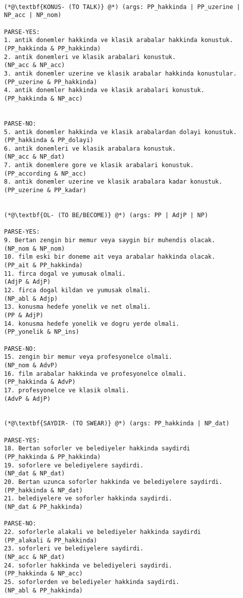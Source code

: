 \begin{lstlisting}

(*@\textbf{KONUS- (TO TALK)} @*) (args: PP_hakkinda | PP_uzerine | NP_acc | NP_nom)

PARSE-YES:
1. antik donemler hakkinda ve klasik arabalar hakkinda konustuk. 
(PP_hakkinda & PP_hakkinda) 
2. antik donemleri ve klasik arabalari konustuk. 
(NP_acc & NP_acc)
3. antik donemler uzerine ve klasik arabalar hakkinda konustular. 
(PP_uzerine & PP_hakkinda)
4. antik donemler hakkinda ve klasik arabalari konustuk.
(PP_hakkinda & NP_acc)


PARSE-NO:
5. antik donemler hakkinda ve klasik arabalardan dolayi konustuk.
(PP_hakkinda & PP_dolayi)
6. antik donemleri ve klasik arabalara konustuk.
(NP_acc & NP_dat)
7. antik donemlere gore ve klasik arabalari konustuk.
(PP_according & NP_acc)
8. antik donemler uzerine ve klasik arabalara kadar konustuk.
(PP_uzerine & PP_kadar)


(*@\textbf{OL- (TO BE/BECOME)} @*) (args: PP | AdjP | NP)

PARSE-YES:
9. Bertan zengin bir memur veya saygin bir muhendis olacak.
(NP_nom & NP_nom)
10. film eski bir doneme ait veya arabalar hakkinda olacak.
(PP_ait & PP_hakkinda)
11. firca dogal ve yumusak olmali.
(AdjP & AdjP)
12. firca dogal kildan ve yumusak olmali.
(NP_abl & Adjp)
13. konusma hedefe yonelik ve net olmali.
(PP & AdjP)
14. konusma hedefe yonelik ve dogru yerde olmali.
(PP_yonelik & NP_ins)

PARSE-NO:
15. zengin bir memur veya profesyonelce olmali.
(NP_nom & AdvP)
16. film arabalar hakkinda ve profesyonelce olmali.
(PP_hakkinda & AdvP)
17. profesyonelce ve klasik olmali.
(AdvP & AdjP)


(*@\textbf{SAYDIR- (TO SWEAR)} @*) (args: PP_hakkinda | NP_dat)

PARSE-YES:
18. Bertan soforler ve belediyeler hakkinda saydirdi
(PP_hakkinda & PP_hakkinda)
19. soforlere ve belediyelere saydirdi.
(NP_dat & NP_dat)
20. Bertan uzunca soforler hakkinda ve belediyelere saydirdi.
(PP_hakkinda & NP_dat)
21. belediyelere ve soforler hakkinda saydirdi.
(NP_dat & PP_hakkinda)

PARSE-NO:
22. soforlerle alakali ve belediyeler hakkinda saydirdi
(PP_alakali & PP_hakkinda)
23. soforleri ve belediyelere saydirdi.
(NP_acc & NP_dat)
24. soforler hakkinda ve belediyeleri saydirdi.
(PP_hakkinda & NP_acc)
25. soforlerden ve belediyeler hakkinda saydirdi.
(NP_abl & PP_hakkinda)


\end{lstlisting}
